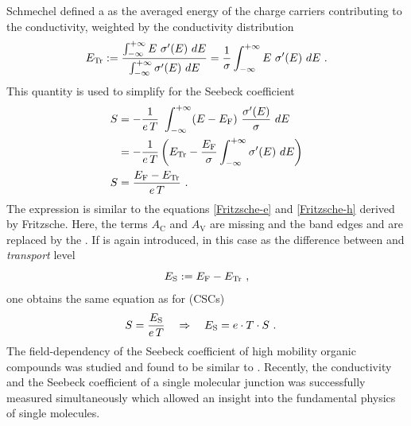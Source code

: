 Schmechel defined a \EtLong \Et as the averaged energy of the charge carriers contributing to the conductivity, weighted by the conductivity distribution
\begin{equation}
\Et :=  \frac
{ \int_{-\infty} ^{+\infty} E ~ \c'(E) ~ dE }
{ \int_{-\infty} ^{+\infty} \c'(E) ~ dE }
= \frac{1}{\c} \int_{-\infty} ^{+\infty} E ~ \c'(E) ~ dE
\label{eq:DefEt}
\PUNKT
\end{equation}
This quantity is used to simplify  for the Seebeck coefficient
\begin{align}
\S &= - \frac{1}{e\,T} ~ \int_{-\infty} ^{+\infty} (E-\Ef) ~ \frac{\c'(E)}{\c} ~ dE
\nonumber
 \\
 &= - \frac{1}{e\,T} \left(\Et - \frac{\Ef}{\c} \int_{-\infty} ^{+\infty} \c'(E)  ~ dE \right)\\
\S &=\frac{\Ef-\Et}{e\,T} \label{eq:Schmechel-S}
\PUNKT
\end{align}
The expression \lasteq is similar to the equations \eqref{Fritzsche-e} and \eqref{Fritzsche-h} derived by Fritzsche. Here, the terms $A_\text{C}$ and $A_\text{V}$ are missing and the band edges \Ec and \Ev are replaced by the \EtLong \Et. If \Es is again introduced, in this case as the difference between \EfLong and \emph{transport} level %
\begin{equation}
\Es := \Ef - \Et\label{eq:Es=Ef-Et}
\KOMMA
\end{equation}
one obtains the same equation as for \CSCs (CSCs)%
\begin{align}
\S &=\frac{\Es}{e\,T} \quad \Rightarrow \quad \Es = e \cdot T \cdot S
\label{eq:S-Es-org}
\PUNKT
\end{align}
The field-dependency of the Seebeck coefficient of high mobility organic compounds was studied and found to be similar to \CSCs\cite{Pernstich2008}.
Recently, the conductivity and the Seebeck coefficient of a single molecular junction was successfully measured simultaneously\cite{Widawsky2012} which allowed an insight into the fundamental physics of single molecules.

%

